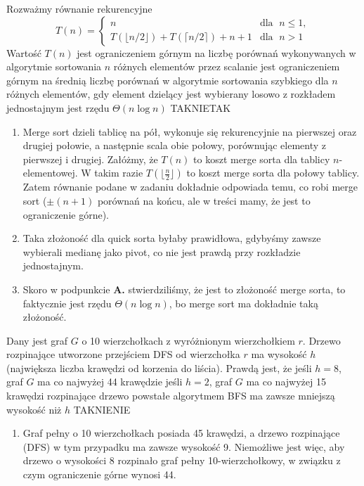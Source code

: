 \begin{solutions}
    \sol Rozważmy równanie rekurencyjne $$ T(n) = \begin{cases} n & \text{dla }  \; n \leq 1 ,\\ T(\lfloor n/2 \rfloor) + T(\lceil n/2 \rceil ) + n + 1 & \text{dla } \; n > 1 \end{cases} $$
    Wartość $T(n) $
    \answerss
    {jest ograniczeniem górnym na liczbę porównań wykonywanych w algorytmie sortowania $n$ różnych elementów przez scalanie}
    {jest ograniczeniem górnym na średnią liczbę porównań w algorytmie sortowania szybkiego dla $n$ różnych elementów, gdy element dzielący jest wybierany losowo z rozkładem jednostajnym}
    {jest rzędu $\Theta (n \log n)$}
    {TAK}{NIE}{TAK}

    \begin{enumerate}[\bf A.]
        \item Merge sort dzieli tablicę na pół, wykonuje się rekurencyjnie na pierwszej oraz drugiej połowie, a następnie scala obie połowy, porównując elementy z pierwszej i drugiej. Załóżmy, że $T(n)$ to koszt merge sorta dla tablicy $n$-elementowej. W takim razie $T(\lfloor{\frac{n}{2}} \rfloor)$ to koszt merge sorta dla połowy tablicy. Zatem równanie podane w zadaniu dokładnie odpowiada temu, co robi merge sort ($\pm (n+1)$ porównań na końcu, ale w treści mamy, że jest to ograniczenie górne).

        \item Taka złożoność dla quick sorta byłaby prawidłowa, gdybyśmy zawsze wybierali medianę jako pivot, co nie jest prawdą przy rozkładzie jednostajnym.

        \item Skoro w podpunkcie \textbf{A.} stwierdziliśmy, że jest to złożoność merge sorta, to faktycznie jest rzędu $\Theta(n \log n)$, bo merge sort ma dokładnie taką złożoność.
    \end{enumerate}

    \sol Dany jest graf $G$ o 10 wierzchołkach z wyróżnionym wierzchołkiem $r$. Drzewo rozpinające utworzone przejściem DFS od wierzchołka $r$ ma wysokość $h$ (największa liczba krawędzi od korzenia do liścia). Prawdą jest, że
    \answerss
    {jeśli $h = 8$, graf $G$ ma co najwyżej 44 krawędzie}
    {jeśli $h = 2$, graf $G$ ma co najwyżej 15 krawędzi}
    {rozpinające drzewo powstałe algorytmem BFS ma zawsze mniejszą wysokość niż $h$}
    {TAK}{NIE}{NIE}

    \begin{enumerate}[\bf A.]
        \item Graf pełny o 10 wierzchołkach posiada 45 krawędzi, a drzewo rozpinające (DFS) w tym przypadku ma zawsze wysokość 9. Niemożliwe jest więc, aby drzewo o wysokości 8 rozpinało graf pełny 10-wierzchołkowy, w związku z czym ograniczenie górne wynosi 44.
        

\end{enumerate}
\end{solutions}
